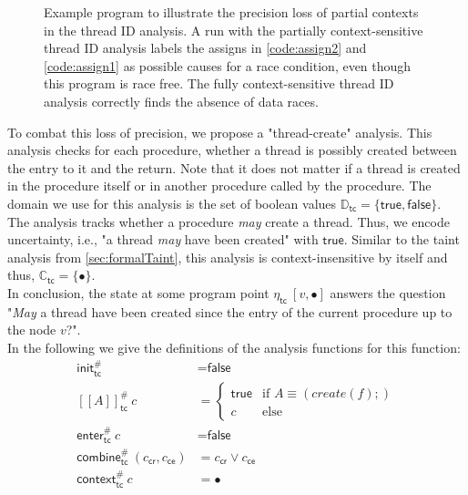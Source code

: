   \begin{figure}
    \centering
    \begin{subfigure}{.35\textwidth}
      \centering
      
    \end{subfigure}
    \caption{Example program to illustrate the precision loss of partial contexts in the thread ID analysis. A run with the partially context-sensitive thread ID analysis labels the assigns in \autoref{code:assign2} and \autoref{code:assign1} as possible causes for a race condition, even though this program is race free. The fully context-sensitive thread ID analysis correctly finds the absence of data races.}
    \label{fig:example_thread}
  \end{figure}

  To combat this loss of precision, we propose a "thread-create" analysis. This analysis checks for each procedure, whether a thread is possibly created between the entry to it and the return. Note that it does not matter if a thread is created in the procedure itself or in another procedure called by the procedure. The domain we use for this analysis is the set of boolean values $\mathbb{D}_\textsf{tc} = \{\textsf{true}, \textsf{false}\}$. The analysis tracks whether a procedure \textit{may} create a thread. Thus, we encode uncertainty, i.e., "a thread \textit{may} have been created" with $\textsf{true}$. Similar to the taint analysis from \autoref{sec:formalTaint}, this analysis is context-insensitive by itself and thus, $\mathbb{C}_\textsf{tc} = \{\bullet\}$.\\
  In conclusion, the state at some program point $\eta_\textsf{tc}\ [v,\bullet]$ answers the question "\textit{May} a thread have been created since the entry of the current procedure up to the node $v$?".\\
  In the following we give the definitions of the analysis functions for this function:
  \begin{align*}
    \textsf{init}^{\#}_\textsf{tc} &= \textsf{false}\\
    [\![ A ]\!]^{\#}_\textsf{tc}\ c &= \left\{ \begin{array}{ll}
      \textsf{true} & \text{if }A \equiv (create(f);)\\
      c & \text{else}
    \end{array} \right. \\
    \textsf{enter}^{\#}_\textsf{tc}\ c &= \textsf{false}\\
    \textsf{combine}^{\#}_\textsf{tc}\ (c_\textsf{cr}, c_\textsf{ce}) &= c_\textsf{cr} \lor c_\textsf{ce}\\
    \textsf{context}^{\#}_\textsf{tc}\ c &= \bullet\\
  \end{align*}
  

